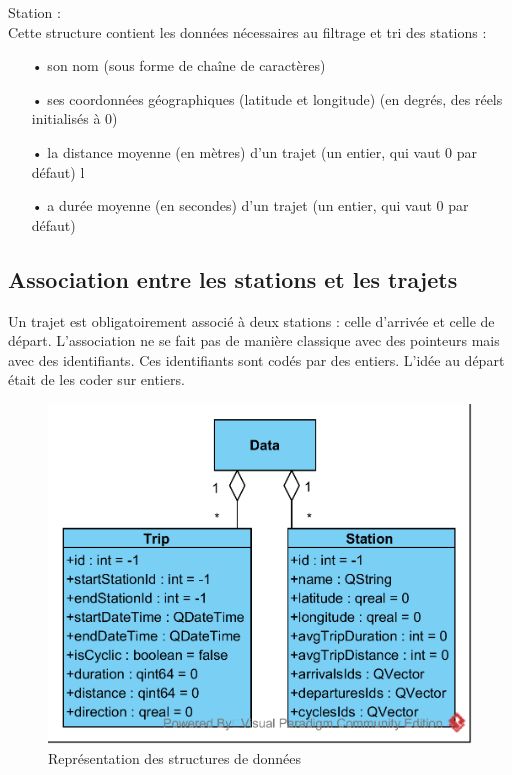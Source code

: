 \documentclass[12pt]{article}
\begin{document}
		
		Station :\\
		Cette structure contient les données nécessaires au filtrage et tri des stations :\\
		\begin{itemize}
			\item[•]son nom (sous forme de chaîne de caractères)
			\item[•]ses coordonnées géographiques (latitude et longitude) (en degrés,
			des réels initialisés à 0)
			\item[•]la distance moyenne (en mètres) d’un trajet (un entier, qui vaut 0 par défaut)
			l\item[•]a durée moyenne (en secondes) d’un trajet (un entier, qui vaut 0 par défaut)
		\end{itemize}
		
		\subsection{Association entre les stations et les trajets}
		Un trajet est obligatoirement associé à deux stations : celle d’arrivée et celle
		de départ. L’association ne se fait pas de manière classique avec des pointeurs mais avec des
		identifiants. Ces identifiants sont codés par des entiers. L’idée au départ était de les
		coder sur entiers.

		\begin{figure}[!h]
		\begin{center}
		\includegraphics[scale=1]{dia_class_data.png}
		\caption{Représentation des structures de données}
		\end{center}
		\end{figure}
		
\end{document}
